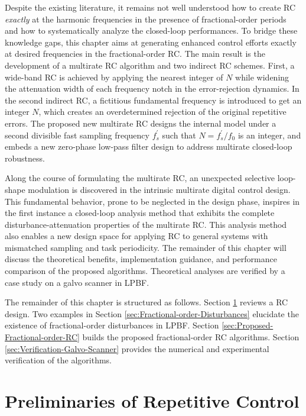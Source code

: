 \documentclass [11pt, proquest] {uwthesis}[2020/02/24]
\begin{document}
Despite the existing literature, it remains not well understood how
to create RC \emph{exactly} at the harmonic frequencies in the presence
of fractional-order periods and how to systematically analyze the
closed-loop performances. To bridge these knowledge gaps, this chapter
aims at generating enhanced control efforts exactly at desired frequencies
in the fractional-order RC. The main result is the development of
a multirate RC algorithm and two indirect RC schemes. First, a wide-band
RC is achieved by applying the nearest integer of $N$ while widening
the attenuation width of each frequency notch in the error-rejection
dynamics. In the second indirect RC, a fictitious fundamental frequency
is introduced to get an integer $N$, which creates an overdetermined
rejection of the original repetitive errors. The proposed new multirate
RC designs the internal model under a second divisible fast sampling
frequency $f_{s}^{'}$ such that $N=f_{s}^{'}/f_{0}$ is an integer,
and embeds a new zero-phase low-pass filter design to address multirate
closed-loop robustness.

Along the course of formulating the multirate RC, an unexpected selective
loop-shape modulation is discovered in the intrinsic multirate digital
control design. This fundamental behavior, prone to be neglected in
the design phase, inspires in the first instance a closed-loop analysis
method that exhibits the complete disturbance-attenuation properties
of the multirate RC. This analysis method also enables a new design
space for applying RC to general systems with mismatched sampling
and task periodicity. The remainder of this chapter will discuss the
theoretical benefits, implementation guidance, and performance comparison
of the proposed algorithms. Theoretical analyses are verified by a
case study on a galvo scanner in LPBF.

The remainder of this chapter is structured as follows. Section \ref{sec:Repetitve-Control}
 reviews a RC design. Two examples in Section \ref{sec:Fractional-order-Disturbances}
elucidate the existence
of fractional-order disturbances in LPBF. Section \ref{sec:Proposed-Fractional-order-RC}
builds the proposed fractional-order RC algorithms. Section \ref{sec:Verification-Galvo-Scanner}
provides the numerical and experimental verification of the algorithms.

\section{Preliminaries of Repetitive Control} \label{sec:Repetitve-Control}
\end{document}
